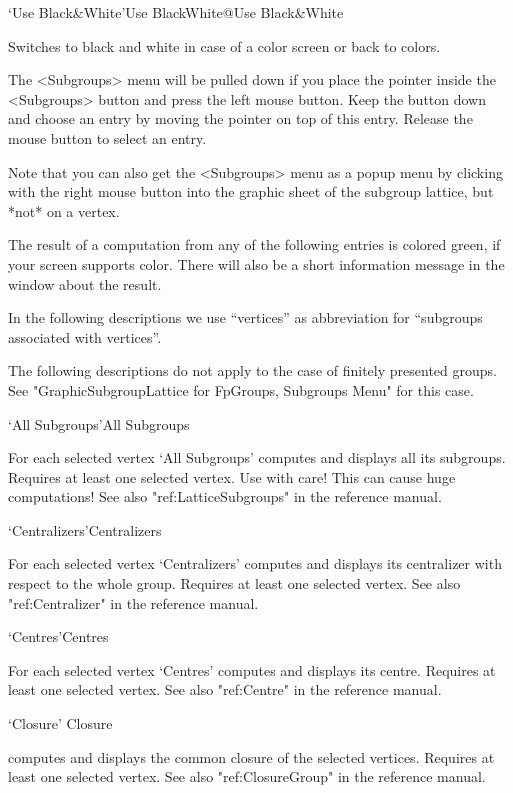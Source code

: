 \>`Use Black\&White'{Use BlackWhite}@{Use Black\&White}

Switches to black and white in case of a color screen or back to colors.



The <Subgroups> menu will be pulled down  if you place the pointer inside
the <Subgroups> button and press the left mouse  button.  Keep the button
down and choose an entry   by moving the pointer  on  top of this  entry.
Release the mouse button to select an entry.

Note that you can also get the <Subgroups> menu as a popup menu by
clicking with the right mouse button into the graphic sheet of the subgroup
lattice, but *not* on a vertex.

The result   of a computation from   any of the  following  entries is
colored green, if your screen supports color.  There will also be a short
information message in the {\GAP} window about the result.

In the following descriptions   we use ``vertices'' as abbreviation  for
``subgroups associated with vertices''.

The following descriptions do not apply to the case of finitely presented
groups. See "GraphicSubgroupLattice for FpGroups, Subgroups Menu" for this
case. 

\>`All Subgroups'{All Subgroups}

For each selected vertex `All Subgroups' computes and displays all its
subgroups. Requires at least one selected vertex. Use with care! This can
cause huge computations!  See also "ref:LatticeSubgroups" in the {\GAP}
reference manual.

\>`Centralizers'{Centralizers}

For each selected vertex `Centralizers' computes and displays its
centralizer with respect to the whole group.  Requires at least one
selected vertex.  See also "ref:Centralizer" in the {\GAP}
reference manual.

\>`Centres'{Centres}

For each selected vertex `Centres' computes and displays its centre.
Requires at least one selected vertex. See also "ref:Centre" in the {\GAP}
reference manual.

\>`Closure' {Closure}

computes and displays the common closure of the selected vertices.
Requires at least one selected vertex. See also "ref:ClosureGroup" in the
{\GAP} reference manual.


